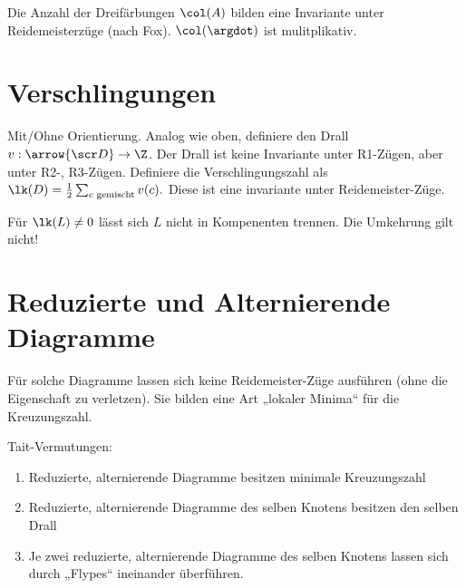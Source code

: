 Die Anzahl der Dreifärbungen $\col(A)$ bilden eine Invariante unter Reidemeisterzüge (nach Fox).
$\col(\argdot)$ ist mulitplikativ.


\section{Verschlingungen}

Mit/Ohne Orientierung.
Analog wie oben, definiere den Drall $v: \arrow{\scr D} \to \Z$.
Der Drall ist keine Invariante unter R1-Zügen, aber unter R2-, R3-Zügen.
Definiere die Verschlingungszahl als
\begin{math}
    \lk(D) = \frac{1}{2} \sum_{\text{$c$ gemischt}} v(c).
\end{math}
Diese ist eine invariante unter Reidemeister-Züge.

Für $\lk(L) \neq 0$ lässt sich $L$ nicht in Kompenenten trennen.
Die Umkehrung gilt nicht!

\section{Reduzierte und Alternierende Diagramme}

Für solche Diagramme lassen sich keine Reidemeister-Züge ausführen (ohne die Eigenschaft zu verletzen).
Sie bilden eine Art „lokaler Minima“ für die Kreuzungszahl.

Tait-Vermutungen:
\begin{enumerate}[1.]
    \item
        Reduzierte, alternierende Diagramme besitzen minimale Kreuzungszahl
    \item
        Reduzierte, alternierende Diagramme des selben Knotens besitzen den selben Drall
    \item
        Je zwei reduzierte, alternierende Diagramme des selben Knotens lassen sich durch „Flypes“ ineinander überführen.
\end{enumerate}
